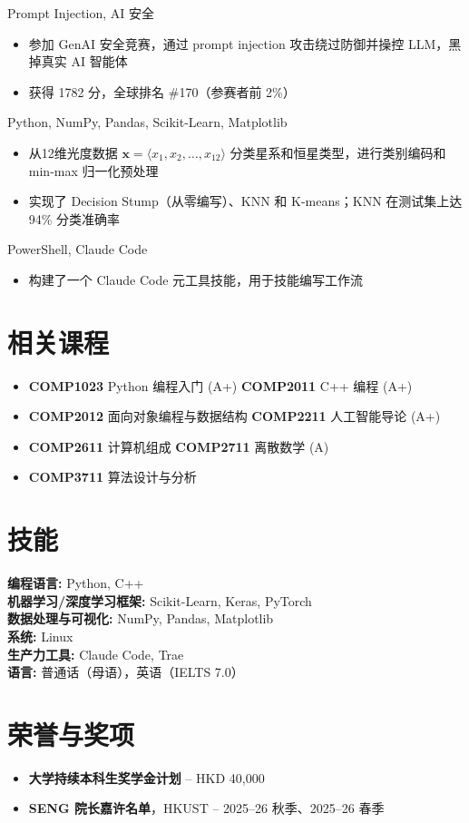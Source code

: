 \documentclass{common/resume}
\begin{document}
  {Prompt Injection, AI 安全}

\begin{itemize}
  \item 参加 GenAI 安全竞赛，通过 prompt injection 攻击绕过防御并操控 LLM，黑掉真实 AI 智能体
  \item 获得 1782 分，全球排名 \#170（参赛者前 2\%）
\end{itemize}

  {Python, NumPy, Pandas, Scikit-Learn, Matplotlib}

\begin{itemize}
  \item 从12维光度数据 $\mathbf{x} = \langle x_1, x_2, \ldots, x_{12} \rangle$ 分类星系和恒星类型，进行类别编码和 min-max 归一化预处理
  \item 实现了 Decision Stump（从零编写）、KNN 和 K-means；KNN 在测试集上达 94\% 分类准确率
\end{itemize}

  {PowerShell, Claude Code}

\begin{itemize}
  \item 构建了一个 Claude Code 元工具技能，用于技能编写工作流
\end{itemize}

\section{相关课程}

\begin{itemize}
  \item \textbf{COMP1023} Python 编程入门 (A+) \hfill \textbf{COMP2011} C++ 编程 (A+)
  \item \textbf{COMP2012} 面向对象编程与数据结构 \hfill \textbf{COMP2211} 人工智能导论 (A+)
  \item \textbf{COMP2611} 计算机组成 \hfill \textbf{COMP2711} 离散数学 (A)
  \item \textbf{COMP3711} 算法设计与分析
\end{itemize}

\section{技能}

\textbf{编程语言:} Python, C++ \\
\textbf{机器学习/深度学习框架:} Scikit-Learn, Keras, PyTorch \\
\textbf{数据处理与可视化:} NumPy, Pandas, Matplotlib \\
\textbf{系统:} Linux \\
\textbf{生产力工具:} Claude Code, Trae \\
\textbf{语言:} 普通话（母语），英语（IELTS 7.0）

\section{荣誉与奖项}

\begin{itemize}
  \item \textbf{大学持续本科生奖学金计划} -- HKD 40,000
  \item \textbf{SENG 院长嘉许名单}，HKUST -- 2025--26 秋季、2025--26 春季
\end{itemize}
\end{document}

